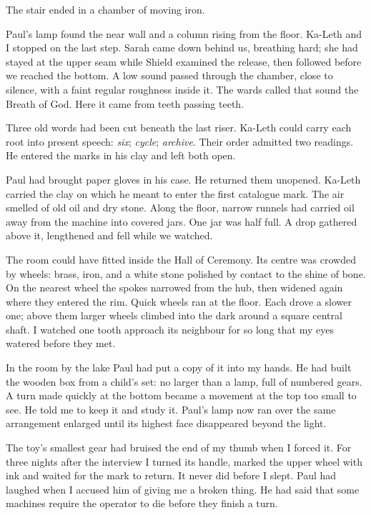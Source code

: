 
The stair ended in a chamber of moving iron.\par

Paul's lamp found the near wall and a column rising from the floor. Ka-Leth and I stopped on the last step. Sarah came down behind us, breathing hard; she had stayed at the upper seam while Shield examined the release, then followed before we reached the bottom. A low sound passed through the chamber, close to silence, with a faint regular roughness inside it. The wards called that sound the Breath of God. Here it came from teeth passing teeth.\par

Three old words had been cut beneath the last riser. Ka-Leth could carry each root into present speech: \emph{six}; \emph{cycle}; \emph{archive}. Their order admitted two readings. He entered the marks in his clay and left both open.\par

Paul had brought paper gloves in his case. He returned them unopened. Ka-Leth carried the clay on which he meant to enter the first catalogue mark. The air smelled of old oil and dry stone. Along the floor, narrow runnels had carried oil away from the machine into covered jars. One jar was half full. A drop gathered above it, lengthened and fell while we watched.\par

The room could have fitted inside the Hall of Ceremony. Its centre was crowded by wheels: brass, iron, and a white stone polished by contact to the shine of bone. On the nearest wheel the spokes narrowed from the hub, then widened again where they entered the rim. Quick wheels ran at the floor. Each drove a slower one; above them larger wheels climbed into the dark around a square central shaft. I watched one tooth approach its neighbour for so long that my eyes watered before they met.\par

In the room by the lake Paul had put a copy of it into my hands. He had built the wooden box from a child's set: no larger than a lamp, full of numbered gears. A turn made quickly at the bottom became a movement at the top too small to see. He told me to keep it and study it. Paul's lamp now ran over the same arrangement enlarged until its highest face disappeared beyond the light.\par

The toy's smallest gear had bruised the end of my thumb when I forced it. For three nights after the interview I turned its handle, marked the upper wheel with ink and waited for the mark to return. It never did before I slept. Paul had laughed when I accused him of giving me a broken thing. He had said that some machines require the operator to die before they finish a turn.\par

